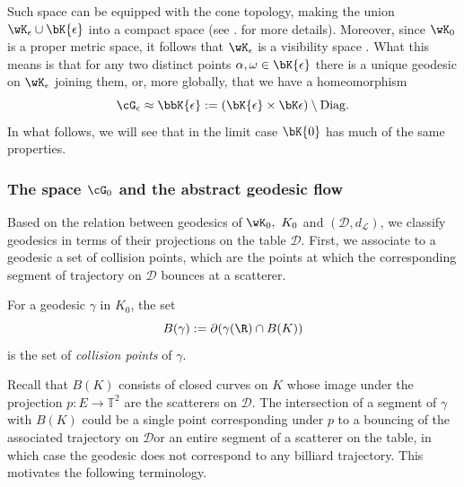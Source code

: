 \documentclass[reqno,11pt]{amsart}
\begin{document}
    Such space can be equipped with the cone topology, making the union \( \wK_\epsilon \cup \bK{\epsilon}\) into a compact space (see \cite[Chapter II.8]{bridson2011metric}. for more details).
    Moreover, since \(\wK_0\) is a proper metric space, it follows that \(\wK_\epsilon\) is a visibility space \cite[Lemma III.3.2]{bridson2011metric}. 
    What this means is that for any two distinct points \(\alpha, \omega \in \bK{\epsilon}\) there is a unique geodesic on \(\wK_\epsilon\) joining them, or, more globally, that we have a homeomorphism
    \[
        \cG_\epsilon \approx \bbK{\epsilon} := (\bK{\epsilon} \times \bK\epsilon) \setminus \mathrm{Diag}.
    \]
    In what follows, we will see that in the limit case \(\bK{0}\) has much of the same properties.
    \subsubsection{The space \(\cG_0\) and the abstract geodesic flow} Based on the relation between geodesics of \(\wK_0, \ K_0\) and \((\mathcal{D}, d_\mathcal{L})\), we classify geodesics in terms of their projections on the table \(\mathcal{D}\).
    First, we associate to a geodesic a set of collision points, which are the points at which the corresponding segment of trajectory on \(\mathcal{D}\) bounces at a scatterer.
    \begin{defi}
        For a geodesic \( \gamma \) in \( K_0 \),  the set 
        \[
            B(\gamma) := \partial(\gamma(\R) \cap B(K)) 
        \]
        is the set of \emph{collision points} of \(\gamma\).
    \end{defi}
    Recall that \(B(K)\) consists of closed curves on \(K\) whose image under the projection \(p\colon E \to \mathbb{T}^2\) are the scatterers on \(\mathcal{D}\).
    The intersection of a segment of \(\gamma\) with \(B(K)\) could be a single point \textemdash corresponding under \(p\) to a bouncing of the associated trajectory on \(\mathcal{D}\)\textemdash or an entire segment of a scatterer on the table, in which case the geodesic does not correspond to any billiard trajectory.
    This motivates the following terminology.
\end{document}
